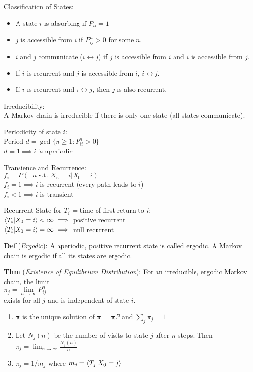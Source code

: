 \documentclass[12pt,landscape]{article}
\newcommand{\tab}{\hspace*{1em}}
\newcommand{\ds}{\displaystyle}
\newcommand{\defn}[1]{\textbf{Def} (\emph{#1})}
\newcommand{\thm}[1]{\textbf{Thm} (\emph{#1})}
\theoremstyle{definition}
\begin{document}
\newpage

\begin{minipage}[t]{0.33\textwidth}
Classification of States:
\begin{itemize}
	\item A state $i$ is absorbing if $P_{ii} = 1$
	\item $j$ is accessible from $i$ if $P_{ij}^n > 0$ for some $n$.
	\item $i$ and $j$ communicate ($i \leftrightarrow j$) if $j$ is accessible from $i$ and $i$ is accessible from $j$.
	\item If $i$ is recurrent and $j$ is accessible from $i$, $i \leftrightarrow j$.
	\item If $i$ is recurrent and $i \leftrightarrow j$, then $j$ is also recurrent.
\end{itemize}

Irreducibility:\\
\tab A Markov chain is irreducible if there is only one state (all states communicate).

Periodicity of state $i$:\\
\tab Period $d = \gcd\{n \geq 1 : P_{ii}^n > 0\}$\\
\tab $d = 1 \implies i$ is aperiodic

Transience and Recurrence:\\
\tab $f_i = P(\exists n \text{ s.t. } X_n = i | X_0 = i)$\\
\tab $f_i = 1 \implies i$ is recurrent (every path leads to $i$)\\
\tab $f_i < 1 \implies i$ is transient

Recurrent State for $T_i$ = time of first return to $i$:\\
\tab $\expval{T_i | X_0 = i} < \infty \implies$ positive recurrent\\
\tab $\expval{T_i | X_0 = i} = \infty \implies$ null recurrent

\defn{Ergodic}: A aperiodic, positive recurrent state is called ergodic. A Markov chain is ergodic if all its states are ergodic.

\thm{Existence of Equilibrium Distribution}: For an irreducible, ergodic Markov chain, the limit\\
\tab $\pi_j = \lim\limits_{n\rightarrow\infty} P_{ij}^n$\\
exists for all $j$ and is independent of state $i$.
\begin{enumerate}
	\item $\boldsymbol{\pi}$ is the unique solution of $\boldsymbol{\pi} = \boldsymbol{\pi}P$ and $\sum_{j} \pi_j = 1$
	\item Let $N_j(n)$ be the number of visits to state $j$ after $n$ steps. Then $\ds \pi_j = \lim_{n\rightarrow\infty} \frac{N_j(n)}{n}$
	\item $\pi_j = 1/m_j$ where $m_j = \expval{T_j | X_0 = j}$
\end{enumerate}


\end{minipage}
\end{document}
